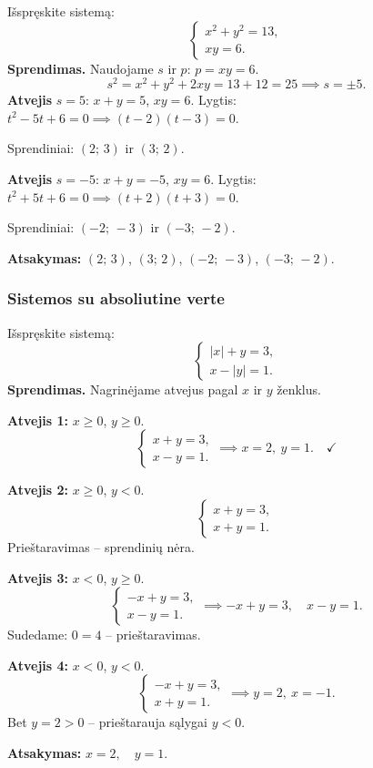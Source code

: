 \begin{example}
Išspręskite sistemą:
\[
  \begin{cases}
    x^2 + y^2 = 13,\\
    xy = 6.
  \end{cases}
\]
\textbf{Sprendimas.} Naudojame $s$ ir $p$: $p = xy = 6$.
\[
  s^2 = x^2 + y^2 + 2xy = 13 + 12 = 25 \implies s = \pm 5.
\]
\textbf{Atvejis} $s = 5$: $x+y = 5$, $xy = 6$. Lygtis: $t^2 - 5t + 6 = 0 \implies (t-2)(t-3) = 0$.

Sprendiniai: $(2;\,3)$ ir $(3;\,2)$.

\textbf{Atvejis} $s = -5$: $x+y = -5$, $xy = 6$. Lygtis: $t^2 + 5t + 6 = 0 \implies (t+2)(t+3) = 0$.

Sprendiniai: $(-2;\,-3)$ ir $(-3;\,-2)$.

\textbf{Atsakymas:} $(2;\,3)$, $(3;\,2)$, $(-2;\,-3)$, $(-3;\,-2)$.
\end{example}

\subsubsection*{Sistemos su absoliutine verte}

\begin{example}
Išspręskite sistemą:
\[
  \begin{cases}
    |x| + y = 3,\\
    x - |y| = 1.
  \end{cases}
\]
\textbf{Sprendimas.} Nagrinėjame atvejus pagal $x$ ir $y$ ženklus.

\textbf{Atvejis 1:} $x \geq 0$, $y \geq 0$.
\[
  \begin{cases} x + y = 3,\\ x - y = 1. \end{cases}
  \implies x = 2,\ y = 1. \quad \checkmark
\]

\textbf{Atvejis 2:} $x \geq 0$, $y < 0$.
\[
  \begin{cases} x + y = 3,\\ x + y = 1. \end{cases}
\]
Prieštaravimas -- sprendinių nėra.

\textbf{Atvejis 3:} $x < 0$, $y \geq 0$.
\[
  \begin{cases} -x + y = 3,\\ x - y = 1. \end{cases}
  \implies -x + y = 3,\quad x - y = 1.
\]
Sudedame: $0 = 4$ -- prieštaravimas.

\textbf{Atvejis 4:} $x < 0$, $y < 0$.
\[
  \begin{cases} -x + y = 3,\\ x + y = 1. \end{cases}
  \implies y = 2,\ x = -1.
\]
Bet $y = 2 > 0$ -- prieštarauja sąlygai $y < 0$.

\textbf{Atsakymas:} $x = 2,\quad y = 1$.
\end{example}

